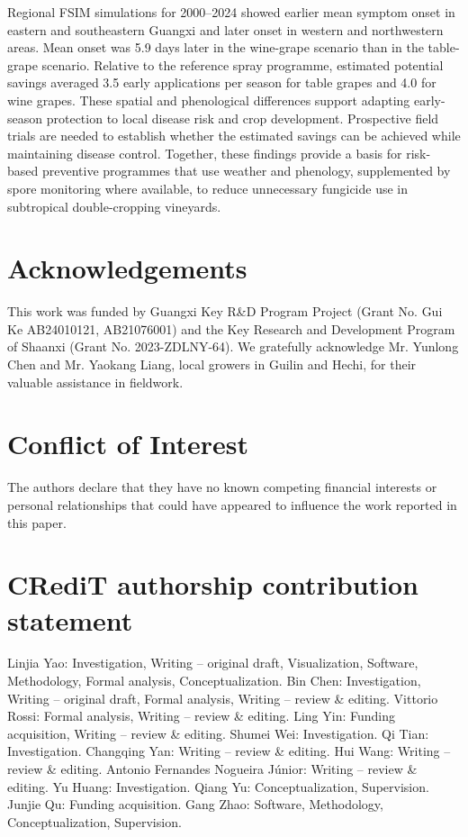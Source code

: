 \documentclass{article}
\begin{document}
Regional FSIM simulations for 2000--2024 showed earlier mean symptom onset
in eastern and southeastern Guangxi and later onset in western and
northwestern areas. Mean onset was 5.9 days later in the wine-grape scenario
than in the table-grape scenario. Relative to the reference spray
programme, estimated potential savings averaged 3.5 early applications per
season for table grapes and 4.0 for wine grapes. These spatial and
phenological differences support adapting early-season protection to local
disease risk and crop development. Prospective field trials are needed to
establish whether the estimated savings can be achieved while maintaining
disease control. Together, these findings provide a basis for risk-based
preventive programmes that use weather and phenology, supplemented by
spore monitoring where available, to reduce unnecessary fungicide use in
subtropical double-cropping vineyards.

\section*{Acknowledgements}\label{acknowledgements}

This work was funded by Guangxi Key R\&D Program Project (Grant No. Gui
Ke AB24010121, AB21076001) and the Key Research and Development Program
of Shaanxi (Grant No. 2023-ZDLNY-64). We gratefully acknowledge Mr. Yunlong Chen and Mr.
Yaokang Liang, local growers in Guilin and Hechi, for their valuable
assistance in fieldwork.

\section*{Conflict of Interest}\label{declaration-of-competing-interest}

The authors declare that they have no known competing financial
interests or personal relationships that could have appeared to
influence the work reported in this paper.

\section*{CRediT authorship contribution
statement}\label{credit-authorship-contribution-statement}

Linjia Yao: Investigation, Writing -- original draft, Visualization,
Software, Methodology, Formal analysis, Conceptualization. Bin Chen:
Investigation, Writing -- original draft, Formal analysis, Writing
-- review \& editing. Vittorio Rossi: Formal analysis, Writing -- review \&
editing. Ling Yin: Funding acquisition, Writing -- review \& editing.
Shumei Wei: Investigation. Qi Tian: Investigation. Changqing Yan:
Writing -- review \& editing. Hui Wang: Writing -- review \& editing.
Antonio Fernandes Nogueira Júnior: Writing -- review \& editing. Yu Huang:
Investigation. Qiang Yu: Conceptualization, Supervision. Junjie Qu:
Funding acquisition. Gang Zhao: Software, Methodology,
Conceptualization, Supervision.
\end{document}

